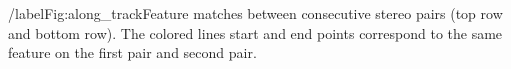 /label{Fig:along_track}Feature matches between consecutive stereo pairs (top row and bottom row). The colored lines start and end points correspond to the same feature on the first pair and second pair. 
  